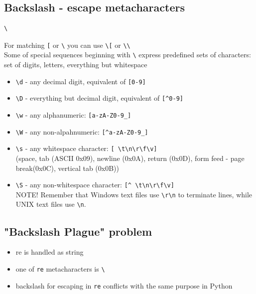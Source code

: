 \documentclass{beamer}
\begin{document}
\subsection{Backslash - escape metacharacters}
\begin{frame}[fragile]
\begin{verbatim}
\
\end{verbatim}
For matching \verb/[/ or \verb/\/ you can use \verb/\[/ or \verb/\\/ \\
\pause
Some of special sequences beginning with \verb/\/ express predefined sets of characters: set of digits, letters, everything but whitespace
\end{frame}

\begin{frame}[fragile]
\begin{itemize}
\item \verb/\d/ - any decimal digit, equivalent of \verb/[0-9]/
\item \verb/\D/ - everything but decimal digit, equivalent of \verb/[^0-9]/
\pause
\item \verb/\w/ - any alphanumeric: \verb/[a-zA-Z0-9_]/
\item \verb/\W/ - any non-alpahnumeric: \verb/[^a-zA-Z0-9_]/
\pause
\item \verb/\s/ - any whitespace character: \verb/[ \t\n\r\f\v]/ \\ (space, tab (ASCII 0x09), newline (0x0A), return (0x0D), form feed - page break(0x0C), vertical tab (0x0B))
\item \verb/\S/ - any non-whitespace character: \verb/[^ \t\n\r\f\v]/
\pause \\
NOTE! Remember that Windows text files use \verb/\r\n/ to terminate lines, while UNIX text files use \verb/\n/.
\end{itemize}
\end{frame}

\subsection{"Backslash Plague" problem}
\begin{frame}[fragile]
\begin{itemize}
\item re is handled as string
\item one of \verb/re/ metacharacters is \verb/\/
\item backslash for escaping in \verb/re/ conflicts with the same purpose in Python
\end{itemize}
\end{frame}
\end{document}
